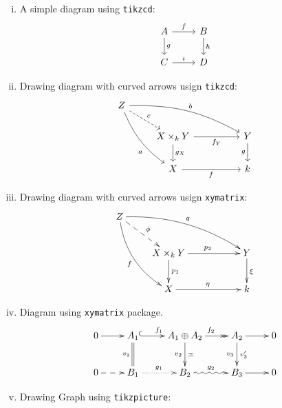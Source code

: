 \documentclass[11pt,leqno]{amsart}
\numberwithin{equation}{subsection}
\theoremstyle{definition}
\begin{document}
\begin{enumerate}[(i)]
	\item A simple diagram using \texttt{tikzcd}:  
	\begin{equation}
	\begin{tikzcd}
	A \ar{r}{f} \ar{d}{g} & B \ar{d}{h} \\ 
	C \ar{r}{i} & D
	\end{tikzcd}
	\end{equation}
	
	\item Drawing diagram with curved arrows usign \texttt{tikzcd}: 
	\begin{equation}
	\begin{gathered}
	\begin{tikzcd}
	Z \arrow[bend right=15]{rdd}[below=8]{a} \arrow[bend left=15]{rrrd}{b} \ar[dashed]{rd}{c} \\
	& X \times_k Y \ar{rr}[below]{f_Y} \ar{d}{g_X} && Y \ar{d}[left]{g} \\
	& X \ar{rr}[below]{f} && k
	\end{tikzcd}
	\end{gathered}
	\end{equation}
	
	\item Drawing diagram with curved arrows usign \texttt{xymatrix}: 
	\begin{equation}
	\begin{gathered}
	\xymatrix{
		Z \ar@/_1pc/[ddr]_f \ar@{-->}[dr]^\phi \ar@/^1pc/[drrr]^g & & & \\ 
		& X \times_k Y \ar[rr]^{p_2} \ar[d]^{p_1} & & Y \ar[d]^\xi \\ 
		& X \ar[rr]^\eta & & k
	}
	\end{gathered}
	\end{equation}
	
	
	\item Diagram using \texttt{xymatrix} package. 
	\begin{equation}
	\begin{gathered}
	\xymatrix{
		0 \ar[r] & A_1 \ar@{^(->}[r]^{f_1} \ar@{=}[d]_{v_1} & A_1\oplus A_2 \ar@{->>}[r]^{f_2}\ar[d]_{v_2}^{\simeq} 
		& A_2 \ar[r] \ar[d]_{v_3}^{v_3'} & 0 \\ 
		0 \ar@{-->}[r] & B_1 \ar@{..>}[r]^{g_1} & B_2 \ar@{~>}[r]^{g_2} & B_3 \ar[r] & 0 
	}
	\end{gathered}
	\end{equation}
	
	\item Drawing Graph using \texttt{tikzpicture}: 
	\begin{center}
	\end{center}
	
\end{enumerate}
\end{document}
